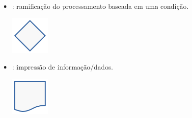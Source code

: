 \begin{itemize}
\item {}: ramificação do processamento baseada em uma condição.
  \begin{center}
    \includegraphics[width=0.75in]{./cap_lingua/dados/fig_fluxograma/decisao.png}
  \end{center}
\item {}: impressão de informação/dados.
  \begin{center}
    \includegraphics[width=0.75in]{./cap_lingua/dados/fig_fluxograma/saida.png}
\end{center}
\end{itemize}

